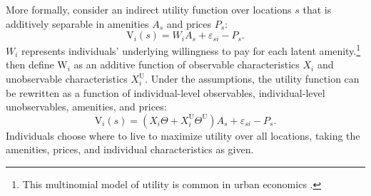 \documentclass[12pt]{article}
\begin{document}
More formally, consider an indirect utility function over locations $s$ that is additively separable in amenities ${A}_s$ and prices ${P}_s$: 
\begin{equation} \label{eq:loc choice}
    \text{V}_i(s) = {W}_i{A}_s + \varepsilon_{si} - {P}_s.
\end{equation} 
${W}_i$ represents individuals' underlying willingness to pay for each latent amenity.\footnote{
  This multinomial model of utility is common in urban economics \citep*[e.g.][]{Kline_Moretti_2014,diamond2021spatial}.
}
\citet{altonji2018estimating} then define $\text{W}_i$ as an additive function of observable characteristics ${X}_i$ and unobservable characteristics ${X}_i^\text{U}$. 
Under the assumptions, the utility function can be rewritten as a function of individual-level observables, individual-level unobservables, amenities, and prices:
\begin{equation}\label{eq:loc choice sub}
    \text{V}_i(s) = ({X}_i\Theta + {X}_i^\text{U}\Theta^\text{U}) {A}_s + \varepsilon_{si} - {P}_s.
\end{equation} 
Individuals choose where to live to maximize utility over all locations, taking the amenities, prices, and individual characteristics as given. 
\end{document}
